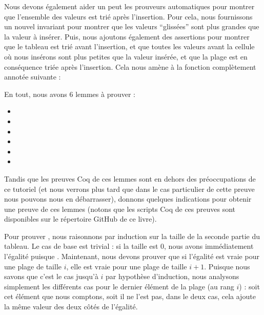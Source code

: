 

Nous devons également aider un peut les prouveurs automatiques pour montrer
que l'ensemble des valeurs est trié après l'insertion. Pour cela, nous fournissons
un nouvel invariant pour montrer que les valeurs ``glissées'' sont plus grandes
que la valeur à insérer. Puis, nous ajoutons également des assertions pour
montrer que le tableau est trié avant l'insertion, et que toutes les valeurs
avant la cellule où nous insérons sont plus petites que la valeur insérée, et
que la plage est en conséquence triée après l'insertion. Cela nous amène à
la fonction  complètement annotée suivante :






En tout, nous avons 6 lemmes à prouver :
\begin{itemize}
\item {}
\item {}
\item {}
\item {}
\item {}
\item {}
\end{itemize}


Tandis que les preuves Coq de ces lemmes sont en dehors des préoccupations de ce
tutoriel (et nous verrons plus tard que dans le cas particulier de cette preuve
nous pouvons nous en débarrasser), donnons quelques indications pour obtenir une
preuve de ces lemmes (notons que les scripts Coq de ces preuves sont disponibles
sur le répertoire GitHub de ce livre).


Pour prouver , nous raisonnons par induction
sur la taille de la seconde partie du tableau. Le cas de base est trivial : si
la taille est 0, nous avons immédiatement l'égalité puisque .
Maintenant, nous devons prouver que si l'égalité est vraie pour une plage de taille
$i$, elle est vraie pour une plage de taille $i+1$. Puisque nous savons que c'est
le cas jusqu'à $i$ par hypothèse d'induction, nous analysons simplement les
différents cas pour le dernier élément de la plage (au rang $i$) : soit cet élément
que nous comptons, soit il ne l'est pas, dans le deux cas, cela ajoute la même
valeur des deux côtés de l'égalité.


